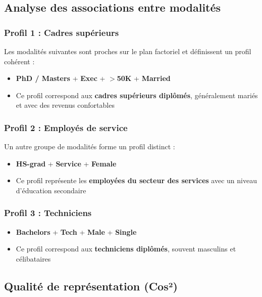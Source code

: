 \documentclass[12pt,a4paper]{article}
\begin{document}
\subsection{Analyse des associations entre modalités}

\subsubsection{Profil 1 : Cadres supérieurs}

Les modalités suivantes sont proches sur le plan factoriel et définissent un profil cohérent :
\begin{itemize}
    \item \textbf{PhD / Masters} + \textbf{Exec} + \textbf{$>$50K} + \textbf{Married}
    \item Ce profil correspond aux \textbf{cadres supérieurs diplômés}, généralement mariés et avec des revenus confortables
\end{itemize}

\subsubsection{Profil 2 : Employés de service}

Un autre groupe de modalités forme un profil distinct :
\begin{itemize}
    \item \textbf{HS-grad} + \textbf{Service} + \textbf{Female}
    \item Ce profil représente les \textbf{employées du secteur des services} avec un niveau d'éducation secondaire
\end{itemize}

\subsubsection{Profil 3 : Techniciens}

\begin{itemize}
    \item \textbf{Bachelors} + \textbf{Tech} + \textbf{Male} + \textbf{Single}
    \item Ce profil correspond aux \textbf{techniciens diplômés}, souvent masculins et célibataires
\end{itemize}

\subsection{Qualité de représentation (Cos²)}
\end{document}
